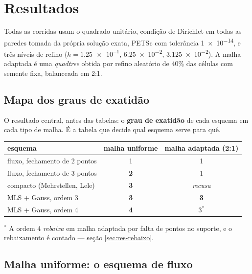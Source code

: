 \section{Resultados}
\label{sec:resultados}


Todas as corridas usam o quadrado unitário, condição de Dirichlet em todas as
paredes tomada da própria solução exata, PETSc com tolerância \num{1e-14}, e três
níveis de refino ($h = \num{1.25e-1}$, \num{6.25e-2}, \num{3.125e-2}). A malha
adaptada é uma \emph{quadtree} obtida por refino aleatório de 40\% das células com
semente fixa, balanceada em 2:1.

\subsection{Mapa dos graus de exatidão}

O resultado central, antes das tabelas: o \textbf{grau de exatidão} de cada
esquema em cada tipo de malha. É a tabela que decide qual esquema serve para quê.

\begin{center}
\begin{tabular}{lcc}
\toprule
esquema & malha uniforme & malha adaptada (2:1) \\
\midrule
fluxo, fechamento de 2 pontos & 1 & 1 \\
fluxo, fechamento de 3 pontos & \textbf{2} & 1 \\
compacto (Mehrstellen, Lele)  & \textbf{3} & \emph{recusa} \\
MLS + Gauss, ordem 3          & \textbf{3} & \textbf{3} \\
MLS + Gauss, ordem 4          & \textbf{4} & 3$^{\ast}$ \\
\bottomrule
\end{tabular}

\smallskip
\footnotesize $^{\ast}$ A ordem 4 \emph{rebaixa} em malha adaptada por falta de
pontos no suporte, e o rebaixamento é contado --- seção \ref{sec:res-rebaixo}.
\end{center}

\subsection{Malha uniforme: o esquema de fluxo}

